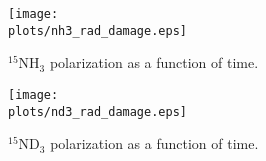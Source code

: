 \begin{figure}[htbp]
\centering
\texttt{[image: \\plots/nh3\_rad\_damage.eps]}
\caption{\small{$^{15}$NH$_3$ polarization as a function of time.}}
\label{raddamage-nh3}
\end{figure}

\begin{figure}[htbp]
\centering
\texttt{[image: \\plots/nd3\_rad\_damage.eps]}
\caption{\small{$^{15}$ND$_3$ polarization as a function of time.}}
\label{raddamage-nd3}
\end{figure}


